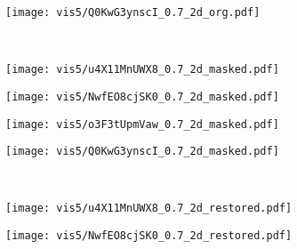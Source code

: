 \documentclass{article}
\begin{document}
{\begin{figure}[h!]
\begin{subfigure}[b]{0.245\linewidth}
    \end{subfigure}
    \begin{subfigure}[b]{0.245\linewidth}
        \texttt{[image: vis5/Q0KwG3ynscI\_0.7\_2d\_org.pdf]}
    \end{subfigure}
    \\
    \begin{subfigure}[b]{0.245\linewidth}
        \texttt{[image: vis5/u4X11MnUWX8\_0.7\_2d\_masked.pdf]}
    \end{subfigure}    
    \begin{subfigure}[b]{0.245\linewidth}
        \texttt{[image: vis5/NwfEO8cjSK0\_0.7\_2d\_masked.pdf]}
    \end{subfigure}      
    \begin{subfigure}[b]{0.245\linewidth}
        \texttt{[image: vis5/o3F3tUpmVaw\_0.7\_2d\_masked.pdf]}
    \end{subfigure}
    \begin{subfigure}[b]{0.245\linewidth}
        \texttt{[image: vis5/Q0KwG3ynscI\_0.7\_2d\_masked.pdf]}
    \end{subfigure}
    \\
    \begin{subfigure}[b]{0.245\linewidth}
        \texttt{[image: vis5/u4X11MnUWX8\_0.7\_2d\_restored.pdf]}
\label{fig:app:vis:i}
    \end{subfigure} 
    \begin{subfigure}[b]{0.245\linewidth}
        \texttt{[image: vis5/NwfEO8cjSK0\_0.7\_2d\_restored.pdf]}
\label{fig:app:vis:j}
    \end{subfigure}    

\end{figure}}
\end{document}
